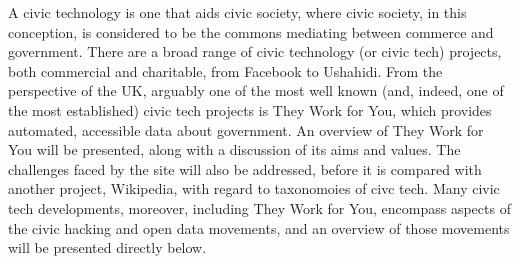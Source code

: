 A civic technology is one that aids civic society, where civic society, in this conception, is considered to be the commons mediating between commerce and government.
There are a broad range of civic technology (or civic tech) projects, both commercial and charitable, from Facebook to Ushahidi. 
From the perspective of the UK, arguably one of the most well known (and, indeed, one of the most established) civic tech projects is They Work for You, which provides automated, accessible data about government. 
An overview of They Work for You will be presented, along with a discussion of its aims and values. 
The challenges faced by the site will also be addressed, before it is compared with another project, Wikipedia, with regard to taxonomoies of civc tech.
Many civic tech developments, moreover, including They Work for You, encompass aspects of the civic hacking and open data movements,
and an overview of those movements will be presented directly below.